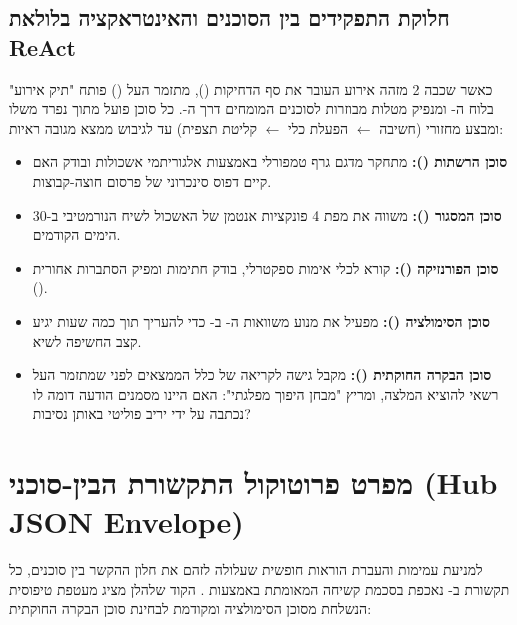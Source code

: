 \subsection{חלוקת התפקידים בין הסוכנים והאינטראקציה בלולאת ReAct}
כאשר שכבה 2 מזהה אירוע העובר את סף הדחיקות (), מתזמר העל () פותח "תיק אירוע" בלוח ה- ומנפיק מטלות מבוזרות לסוכנים המומחים דרך ה-. כל סוכן פועל מתוך  נפרד משלו ומבצע מחזורי  (חשיבה $\leftarrow$ הפעלת כלי $\leftarrow$ קליטת תצפית) עד לגיבוש ממצא מגובה ראיות:
\begin{itemize}
    \item \textbf{סוכן הרשתות ():} מתחקר מדגם גרף טמפורלי באמצעות אלגוריתמי אשכולות ובודק האם קיים דפוס סינכרוני של פרסום חוצה-קבוצות.
    \item \textbf{סוכן המסגור ():} משווה את מפת 4 פונקציות אנטמן של האשכול לשיח הנורמטיבי ב-30 הימים הקודמים.
    \item \textbf{סוכן הפורנזיקה ():} קורא לכלי אימות ספקטרלי, בודק חתימות  ומפיק הסתברות אחורית ().
    \item \textbf{סוכן הסימולציה ():} מפעיל את מנוע משוואות ה- ב- כדי להעריך תוך כמה שעות יגיע קצב החשיפה לשיא.
    \item \textbf{סוכן הבקרה החוקתית ():} מקבל גישה לקריאה של כלל הממצאים לפני שמתזמר העל רשאי להוציא המלצה, ומריץ "מבחן היפוך מפלגתי": האם היינו מסמנים הודעה דומה לו נכתבה על ידי יריב פוליטי באותן נסיבות?
\end{itemize}

\section{מפרט פרוטוקול התקשורת הבין-סוכני (Hub JSON Envelope)}
למניעת עמימות והעברת הוראות חופשית שעלולה לזהם את חלון ההקשר בין סוכנים, כל תקשורת ב- נאכפת בסכמת  קשיחה המאומתת באמצעות . הקוד שלהלן מציג מעטפת טיפוסית הנשלחת מסוכן הסימולציה ומקודמת לבחינת סוכן הבקרה החוקתית:

